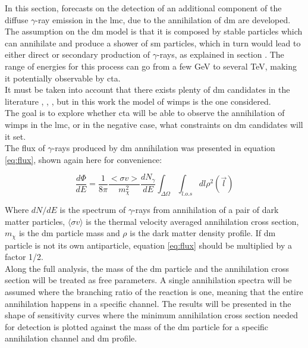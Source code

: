 \documentclass[main.tex]{subfiles}
\begin{document}
In this section, forecasts on the detection of an additional component of the diffuse $\gamma$-ray emission in the \gls{lmc}, due to the annihilation of \gls{dm} are developed. The assumption on the \gls{dm} model is that it is composed by stable particles which can annihilate and produce a shower of \gls{sm} particles, which in turn would lead to either direct or secondary production of $\gamma$-rays, as explained in section \label{sec:DM}. The range of energies for this process can go from a few GeV to several TeV, making it potentially observable by \gls{cta}.\\
It must be taken into account that there exists plenty of \gls{dm} candidates in the literature \cite{2004DMcandidates}, \cite{2005DMcandidates}, \cite{2009DMcandidates}, but in this work the model of \glspl{wimp} is the one considered.\\
The goal is to explore whether \gls{cta} will be able to observe the annihilation of \glspl{wimp} in the \gls{lmc}, or in the negative case, what constraints on \gls{dm} candidates will it set.\\
The flux of $\gamma$-rays produced by \gls{dm} annihilation was presented in equation \ref{eq:flux}, shown again here for convenience:

\begin{equation}
    \frac{d \Phi}{dE}=\frac{1}{8 \pi} \frac{<\sigma v>}{m_{\chi}^2} \frac{d N_{\gamma}}{dE} \int_{\Delta\Omega}\int_{l.o.s} dl \rho^2(\vec{l})
\label{eq:flux}
\end{equation}

Where $dN/dE$ is the spectrum of $\gamma$-rays from annihilation of a pair of dark matter particles, $\langle\sigma v\rangle$ is the thermal velocity averaged annihilation cross section, $m_\chi$ is the \gls{dm} particle mass and $\rho$ is the dark matter density profile. If \gls{dm} particle is not its own antiparticle, equation \ref{eq:flux} should be multiplied by a factor 1/2. \\
Along the full analysis, the mass of the \gls{dm} particle and the annihilation cross section will be treated as free parameters. A single annihilation spectra will be assumed where the branching ratio of the reaction is one, meaning that the entire annihilation happens in a specific channel. The results will be presented in the shape of sensitivity curves where the minimum annihilation cross section needed for detection is plotted against the mass of the \gls{dm} particle for a specific annihilation channel and \gls{dm} profile.
\end{document}
